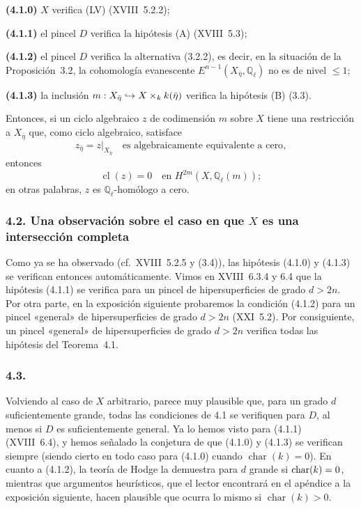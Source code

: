 \medskip
\noindent\textbf{(4.1.0)} $X$ verifica (LV) (XVIII~5.2.2);

\noindent\textbf{(4.1.1)} el pincel $D$ verifica la hipótesis (A)
(XVIII~5.3);

\noindent\textbf{(4.1.2)} el pincel $D$ verifica la alternativa (3.2.2),
es decir, en la situación de la Proposición~3.2, la cohomología
evanescente $E^{n-1}(X_{\bar\eta},\mathbb Q_\ell)$ no es de nivel
$\leq1$;

\noindent\textbf{(4.1.3)} la inclusión
$\sisi{m^*}{m}:X_{\bar\eta}\hookrightarrow X\times_k k(\bar\eta)$
verifica la hipótesis (B) (3.3).

\medskip
Entonces, si un ciclo algebraico $z$ de codimensión $m$ sobre $X$ tiene
una restricción a $X_{\bar\eta}$ que, como ciclo algebraico, satisface
\begin{equation}\tag{4.1.4}
z_{\bar\eta}=z|_{X_{\bar\eta}}
\quad\text{es algebraicamente equivalente a cero},
\end{equation}
entonces
\begin{equation}\tag{4.1.5}
\operatorname{cl}(z)=0
\quad\text{en }H^{2m}(X,\mathbb Q_\ell(m));
\end{equation}
en otras palabras, $z$ es $\mathbb Q_\ell$-homólogo a cero.

\subsubsection*{\texorpdfstring{4.2. Una observación sobre el caso en que $X$ es una
intersección completa}{4.2. Una observación sobre el caso en que X es una intersección completa}}

Como ya se ha observado (cf.~XVIII~5.2.5 y (3.4)), las hipótesis (4.1.0)
y (4.1.3) se verifican entonces automáticamente. Vimos en XVIII~6.3.4 y
6.4 que la hipótesis (4.1.1) se verifica para un pincel de
hipersuperficies de grado $d>2n$. Por otra parte, en la exposición siguiente
probaremos la condición (4.1.2) para un pincel «general» de
hipersuperficies de grado $d>2n$ (XXI~5.2). Por consiguiente, un pincel
«general» de hipersuperficies de grado $d>2n$ verifica todas las
hipótesis del Teorema~4.1.

\pageoriginale

\subsubsection*{4.3.}
Volviendo al caso de $X$ arbitrario, parece muy plausible que, para un
grado $d$ suficientemente grande, todas las condiciones de 4.1 se
verifiquen para $D$, al menos si $D$ es suficientemente general. Ya lo
hemos visto para (4.1.1) (XVIII~6.4), y hemos señalado la conjetura de que
(4.1.0) y (4.1.3) se verifican siempre (siendo cierto en todo caso para
(4.1.0) cuando $\operatorname{char}(k)=0$). En cuanto a (4.1.2), la teoría
de Hodge la demuestra para $d$ grande si
$\operatorname{char}(k)\sisi{\ne}{=}0$, mientras que argumentos
heurísticos, que el lector encontrará en el apéndice a la exposición siguiente,
hacen plausible que ocurra lo mismo si $\operatorname{char}(k)>0$.

